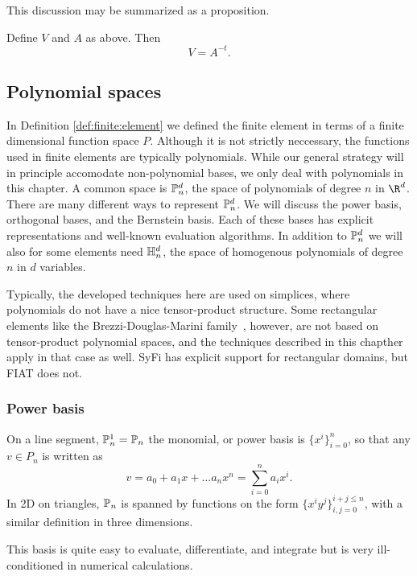 This discussion may be summarized as a proposition.
\begin{proposition}
Define \( V \) and \( A \) as above.  Then
\begin{equation}
V = A^{-t}.
\end{equation}
\end{proposition}

\subsection{Polynomial spaces}
In Definition \ref{def:finite:element} we defined the finite element in terms
of a finite dimensional function space $P$. Although it is not strictly
neccessary,  
the functions used in finite elements are typically polynomials.
While our general strategy will in principle accomodate non-polynomial bases, we
only deal with polynomials in this chapter.
A common space is 
$\P_n^d$, the space of polynomials of degree $n$ in $\R^d$. There 
are many different ways to represent $\P^d_n$. We will discuss the power
basis, orthogonal bases, and the Bernstein basis.  Each of these bases
has explicit representations and well-known evaluation algorithms.
In addition to $\P^d_n$ we will also for some 
elements need $\H^d_n$, the space of homogenous polynomials of degree
\( n \) in \( d \) variables.  

Typically, the developed techniques here 
are used on simplices, where polynomials do not have a nice
tensor-product structure.  Some rectangular elements like the
Brezzi-Douglas-Marini family~\cite{}, however, are not based on
tensor-product polynomial spaces, and the techniques described 
in this chapther apply in that
case as well.  SyFi has explicit support for rectangular domains, but
FIAT does not. 

\subsubsection{Power basis}
On a line segment, $\P_n^1=\P_n$ the monomial, or power basis is 
\( \{ x^i \}_{i=0}^{n} \), so that any \( v \in P_n \) is written as
\begin{equation}
\label{pn1d}
v = a_0 + a_1 x + \ldots a_n x^n = \sum^n_{i=0} a_i x^i.
\end{equation}
In 2D on triangles, $\P_n$ is spanned by functions on the form
\( \{ x^i y^j \}_{i,j=0}^{i+j\leq n} \), with a similar definition in
three dimensions.

This basis is quite easy to evaluate, differentiate, and
integrate but is very ill-conditioned in numerical calculations.

